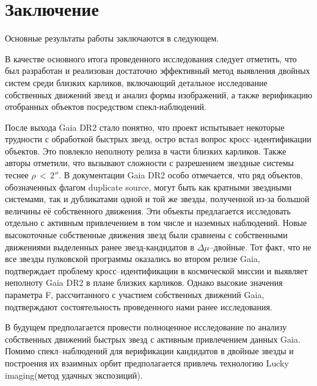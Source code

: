 \chapter*{Заключение}                       %


Основные результаты работы заключаются в следующем.

В качестве основного итога проведенного исследования следует отметить, что был разработан и реализован достаточно эффективный метод выявления двойных систем среди близких карликов, включающий детальное исследование собственных движений звезд и анализ формы изображений, а также верификацию отобранных объектов посредством спекл-наблюдений.

После выхода Gaia DR2 стало понятно, что проект испытывает некоторые трудности с обработкой быстрых звезд, остро встал вопрос кросс--идентификации объектов. Это повлекло неполноту релиза в части близких карликов. Также авторы отметили, что вызывают сложности с разрешением звездные системы теснее $\rho\,<\,2''$. В документации Gaia DR2 особо отмечается, что ряд объектов, обозначенных флагом \glqq duplicate source\grqq , могут быть как кратными звездными системами, так и дубликатами одной и той же звезды, полученной из-за большой величины её собственного движения. Эти объекты предлагается исследовать отдельно с активным привлечением в том числе и наземных наблюдений. Новые высокоточные собственные движения звезд были сравнены с собственными движениями выделенных ранее звезд-кандидатов в $\Delta\mu$--двойные. Тот факт, что не все звезды пулковской программы оказались во втором релизе Gaia, подтверждает проблему кросс--идентификации в космической миссии и выявляет неполноту Gaia DR2 в плане близких карликов. Однако высокие значения параметра F, рассчитанного с участием собственных движений Gaia, подтверждают состоятельность проведенного нами ранее исследования.

В будущем предполагается провести полноценное исследование по анализу собственных движений быстрых звезд с активным привлечением данных Gaia. Помимо спекл--наблюдений для верификации кандидатов в двойные звезды и построения их взаимных орбит предполагается привлечь технологию \glqq Lucky imaging\grqq (метод удачных экспозиций).

